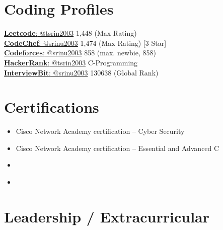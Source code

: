 \documentclass[letterpaper,11pt]{article}
\makeatletter
\newcommand{\resumeItem}[1]{
  \item\small{
    {#1 \vspace{-2pt}}
  }
}
\newcommand{\resumeSubheading}[4]{
  \vspace{-2pt}\item
    \begin{tabular*}{0.97\textwidth}[t]{l@{\extracolsep{\fill}}r}
      \textbf{#1} & \textbf{\small #2} \\
      \textit{\small#3} & \textit{\small #4} \\
    \end{tabular*}\vspace{-7pt}
}
\newcommand{\resumeSubHeadingListStart}{\begin{itemize}[leftmargin=0.15in, label={}]}
\newcommand{\resumeSubHeadingListEnd}{\end{itemize}}
\newcommand{\resumeItemListStart}{\begin{itemize}}
\newcommand{\resumeItemListEnd}{\end{itemize}\vspace{-5pt}}
\makeatother
\begin{document}
\section{Coding Profiles}
  \begin{itemize}[leftmargin=0.15in, label={}]
    \small{\item{
      \href{https://leetcode.com/tsrin2003/}{\underline{\textbf{Leetcode}}{:} @tsrin2003} 1,448 (Max Rating) \\
      \href{https://www.codechef.com/users/srinu2003}{\underline{\textbf{CodeChef}}{:} @srinu2003} 1,474 (Max Rating) [3 Star] \\
      \href{https://codeforces.com/profile/srinu2003}{\underline{\textbf{Codeforces}}{:} @srinu2003} 858 (max. newbie, 858) \\
      \href{https://www.hackerrank.com/tsrin2003}{\underline{\textbf{HackerRank}}{:} @tsrin2003} C-Programming \\
      \href{https://www.interviewbit.com/profile/srinu2003/}{\underline{\textbf{InterviewBit}}{:} @srinu2003} 130638 (Global Rank) \\
      }
    }
  \end{itemize}

\section{Certifications}
      \resumeItemListStart[parsep = -3pt]
        \resumeItem{Cisco Network Academy certification -- Cyber Security}
        \resumeItem{Cisco Network Academy certification -- Essential and Advanced C}
        \resumeItem{}
        \resumeItem{}
      \resumeItemListEnd

  
\section{Leadership / Extracurricular}
        

\end{document}
